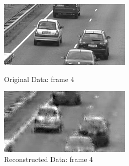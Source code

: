 \documentclass[12pt]{article}
\begin{document}
\begin{itemize}
\begin{enumerate}
    \begin{figure}[H]
        \centering
        \begin{minipage}{.45\textwidth}
            \centering
            \includegraphics[width=\linewidth]{results/cars_7_orig_4.png}
            \caption*{Original Data: frame 4}
        \end{minipage}
        \begin{minipage}{.45\textwidth}
            \centering
            \includegraphics[width=\linewidth]{results/cars_7_recon_4.png}
            \caption*{Reconstructed Data: frame 4}
        \end{minipage}
    \end{figure}
    

\end{enumerate}
\end{itemize}
\end{document}
